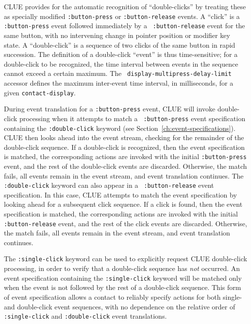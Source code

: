 \documentclass[twoside]{book}
\begin{document}
\begin{sloppy}
CLUE provides for the automatic
recognition of ``double-clicks'' by treating these as specially
modified {\tt :button-press} or {\tt :button-release} events. A
``click'' is a {\tt :button-press} event followed immediately by a {\tt
:button-release} event for the same button, with no intervening change
in pointer position\footnotemark{} or modifier
key state. A ``double-click''
is a sequence of two clicks of the same button in rapid succession. The
definition of a double-click ``event'' is thus time-sensitive; for a
double-click to be recognized, the time interval between events in the
sequence cannot exceed a certain maximum. The {\tt
display-multipress-delay-limit} accessor defines the maximum
inter-event time
interval, in milliseconds,
for a given {\tt contact-display}.

During event translation for a {\tt :button-press} event, CLUE will
invoke double-click processing when it attempts to match a {\tt
:button-press} event specification
containing the {\tt :double-click} keyword (see
Section~\ref{ch:event-specifications}). CLUE then
looks ahead into the event stream, checking for the remainder of the
double-click sequence. If a double-click is recognized, then the event
specification is matched, the corresponding actions are invoked with the
initial {\tt :button-press} event, and the rest of the double-click
events are discarded. Otherwise, the match fails, all events remain in
the event stream, and event translation continues.
The {\tt :double-click} keyword can also appear in a {\tt
:button-release} event specification. In this case, CLUE attempts to
match the event specification by looking ahead for
a subsequent click sequence. If a click is found, then the event
specification is matched, the corresponding actions are invoked with the
initial {\tt :button-release} event, and the rest of the click
events are discarded. Otherwise, the match fails, all events remain in
the event stream, and event translation continues.

The {\tt :single-click} keyword can be used to explicitly request CLUE
double-click processing, in order to verify that a double-click sequence
has {\em not} occurred. An event specification containing the
{\tt :single-click} keyword will be matched only when the event is not
followed by the rest of a
double-click sequence. This form of event specification allows a contact
to reliably specify actions for both single- and double-click event
sequences, with no dependence on the relative order of {\tt
:single-click} and {\tt :double-click} event translations.


\end{sloppy}
\end{document}
